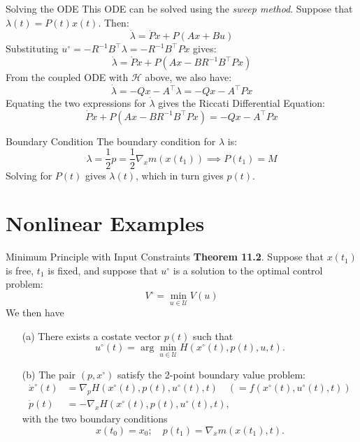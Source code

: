 \documentclass[10pt]{beamer}
\begin{document}
\begin{frame}[fragile]{Solving the ODE}
  This ODE can be solved using the \textit{sweep method}. Suppose that \( \lambda(t) = P(t)x(t) \). Then:
  \[
  \dot{\lambda} = \dot{P} x + P (Ax + Bu)
  \]
  Substituting \( u^\circ = -R^{-1} B^{\top} \lambda = -R^{-1} B^{\top} P x \) gives:
  \[
  \dot{\lambda} = \dot{P} x + P (Ax - BR^{-1} B^{\top} P x)
  \]
  From the coupled ODE with \(\mathcal{H}\) above, we also have:
  \[
  \dot{\lambda} = -Qx - A^{\top} \lambda = -Qx - A^{\top} P x
  \]
  Equating the two expressions for \( \dot{\lambda} \) gives the Riccati Differential Equation:
  \[
  \dot{P} x + P (Ax - BR^{-1} B^{\top} P x) = -Qx - A^{\top} P x
  \]
\end{frame}

\begin{frame}[fragile]{Boundary Condition}
  The boundary condition for \( \lambda \) is:
  \[
  \lambda = \frac{1}{2} p = \frac{1}{2} \nabla_x m(x(t_1)) \implies P(t_1) = M
  \]
  Solving for \( P(t) \) gives \( \lambda(t) \), which in turn gives \( p(t) \).
\end{frame}

\section{Nonlinear Examples}

\begin{frame}[fragile]{Minimum Principle with Input Constraints}
  \textbf{Theorem 11.2}. Suppose that \( x(t_1) \) is free, \( t_1 \) is fixed, and suppose that \( u^\circ \) is a solution to the optimal control problem: 
  \[
    V^\circ = \min_{u \in \mathcal{U}} V(u)
  \]
  We then have
  \begin{itemize}
      \item[(a)] There exists a costate vector \( p(t) \) such that
      \[
        u^\circ (t) = \arg \min_{u \in \mathcal{U}} H(x^\circ (t), p(t), u, t).
      \]
  
      \item[(b)] The pair \( (p, x^\circ) \) satisfy the 2-point boundary value problem:
      \begin{align*}
        \dot{x}^\circ(t) &= \nabla_p H(x^\circ(t), p(t), u^\circ(t), t) \quad \left( = f(x^\circ(t), u^\circ(t), t) \right) \\
        \dot{p}(t) &= -\nabla_x H(x^\circ(t), p(t), u^\circ(t), t),
      \end{align*}
      with the two boundary conditions
      \[
        x(t_0) = x_0; \quad p(t_1) = \nabla_x m(x(t_1), t).
      \]
  \end{itemize}
\end{frame}
  
\end{document}
